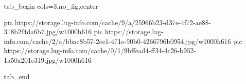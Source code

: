  
 
 
 
 


\ifcmt
  tab_begin cols=3,no_fig,center

     pic https://storage.lug-info.com/cache/9/a/25966b23-d37e-4f72-ae88-318b2f4da6b7.jpg/w1000h616
		 pic https://storage.lug-info.com/cache/2/a/bbac8b57-2ee1-471e-90b0-4266796b0954.jpg/w1000h616
		 pic https://storage.lug-info.com/cache/0/1/9bffead4-ff34-4c26-b952-1a50a201e319.jpg/w1000h616

  tab_end
\fi
